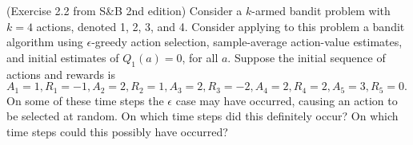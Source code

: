
 (Exercise 2.2 from S\&B 2nd edition) Consider a $k$-armed bandit problem with $k = 4$ actions,
denoted 1, 2, 3, and 4. Consider applying to this problem a bandit algorithm using
$\epsilon$-greedy action selection, sample-average action-value estimates, and initial estimates
of $Q_1(a) = 0$, for all $a$. Suppose the initial sequence of actions and rewards is $A_1 = 1,
R_1 = -1, A_2 = 2, R_2 = 1, A_3 = 2, R_3 = -2, A_4 = 2, R_4 = 2, A_5 = 3, R_5 = 0.$ On some
of these time steps the $\epsilon$ case may have occurred, causing an action to be selected at
random. On which time steps did this definitely occur? On which time steps could this
possibly have occurred?
\smallspace
